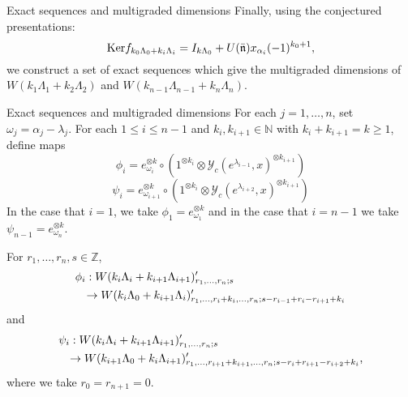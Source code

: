\documentclass{beamer}
\begin{document}
\begin{frame}{Exact sequences and multigraded dimensions}
 Finally, using the conjectured presentations:
 $$
 \mbox{Ker}f_{k_0 \Lambda_0 + k_i\Lambda_i} = I_{k\Lambda_0} + U(\bar{\frak{n}})x_{\alpha_i}(-1)^{k_0+1},
 $$
 we construct a set of exact sequences which give the multigraded dimensions of
 $W(k_1\Lambda_1 + k_2\Lambda_2)$ and $W(k_{n-1}\Lambda_{n-1} + k_n\Lambda_n)$.
\end{frame}

\begin{frame}{Exact sequences and multigraded dimensions}
For each $j=1,\dots,n$, set $\omega_j = \alpha_j - \lambda_j$. \pause
For
each $1 \le i \le n-1$ and
$k_i,k_{i+1} \in \mathbb{N}$ with $k_i + k_{i+1} = k \ge 1$, define maps
$$\phi_i = e_{\omega_i}^{\otimes k} \circ (1^{\otimes k_i} \otimes
\mathcal{Y}_c(e^{\lambda_{i-1}},x)^{\otimes k_{i+1}})$$
$$\psi_i = e_{\omega_{i+1}}^{\otimes k} \circ (1^{\otimes k_{i}}
\otimes \mathcal{Y}_c(e^{\lambda_{i+2}},x)^{\otimes k_{i+1}})$$ In the
case that $i=1$, we take $\phi_1 = e_{\omega_1}^{\otimes k}$ and in
the case that $i=n-1$ we take $\psi_{n-1} = e_{\omega_n}^{\otimes k}$.
\end{frame}
\begin{frame}
\begin{theorem}
 For $r_1,\dots , r_n , s \in \mathbb{Z}$,
\begin{eqnarray}
\lefteqn{\phi_i:W(k_i\Lambda_i + k_{i+1}\Lambda_{i+1})'_{r_1,\dots ,
    r_n;s}}\\ && \rightarrow W(k_i\Lambda_0 +
k_{i+1}\Lambda_i)'_{r_1,\dots,r_i + k_i, \dots ,
  r_n;s-r_{i-1}+r_i-r_{i+1} + k_i}
\end{eqnarray}
and
\begin{eqnarray}
\lefteqn{\psi_i:W(k_i\Lambda_i + k_{i+1}\Lambda_{i+1})'_{r_1,\dots ,
    r_n;s}}\\ && \rightarrow W(k_{i+1}\Lambda_0 +
k_{i}\Lambda_{i+1})'_{r_1,\dots,r_{i+1} + k_{i+1}, \dots ,
  r_n;s-r_{i}+r_{i+1}-r_{i+2} + k_i},
\end{eqnarray}
where we take $r_0 = r_{n+1} = 0$.

\end{theorem}
\end{frame}
\end{document}
